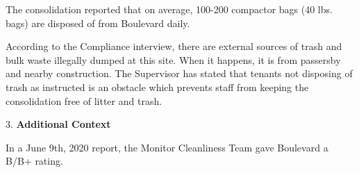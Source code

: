 The consolidation reported that on average, 100-200 compactor bags (40 lbs. bags) are disposed of from Boulevard daily. 

According to the Compliance interview, there are external sources of trash and bulk waste illegally dumped at this site. When it happens, it is from passersby and nearby construction. The Supervisor has stated that tenants not disposing of trash as instructed is an obstacle which prevents staff from keeping the consolidation free of litter and trash. 

3. \textbf{Additional Context}

In a June 9th, 2020 report, the Monitor Cleanliness Team gave Boulevard a B/B+ rating. 